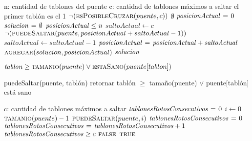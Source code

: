 \vspace*{0.5cm}


\begin{codebox}
\li \Comment n: cantidad de tablones del puente 
\li \Comment c: cantidad de tablones máximos a saltar 
\li \Comment el primer tablón es el 1
\li \If $\neg(\textnormal{\scshape esPosibleCruzar}(puente, c))$
\li     \Then 
            \Return $\emptyset$
        \End
\li $\id{posicionActual} \gets 0$
\li $\id{solucion} \gets \emptyset$
\li \While $\id{posicionActual} \leq \id{n}$
\li     \Do 
            $saltoActual \gets c$
\li         \While $\neg(\textnormal{\scshape puedeSaltar}(puente, posicionActual + saltoActual - 1))$
\li         \Do 
                $saltoActual \gets saltoActual - 1$
            \End
\li     $\id{posicionActual} \gets \id{posicionActual} + \id{saltoActual}$
\li     $\textnormal{\scshape agregar}(solucion, posicionActual)$    
        \End
\li \Return $\id{solucion}$
\end{codebox}      



\vspace*{0.5cm}



\begin{codebox}
    \Return $\id{tablon} \geq \proc{tamanio}(puente) \lor \proc{estaSano}(puente[tablon])$
\end{codebox}



puedeSaltar(puente, tablón)
  retornar tablón $\geq$ tamaño(puente) $\lor$ puente[tablón] está sano



\vspace*{0.5cm}



\begin{codebox}
\li \Comment c: cantidad de tablones máximos a saltar
\li $\id{tablonesRotosConsecutivos} \gets 0$
\li \For $i \gets 0$ \To $\textnormal{\scshape tamanio}(puente) - 1$
\li     \Do 
            \If $\textnormal{\scshape puedeSaltar}(puente, i)$
\li             \Then
                    $\id{tablonesRotosConsecutivos} \gets 0$
\li         \Else
\li             $\id{tablonesRotosConsecutivos} \gets \id{tablonesRotosConsecutivos} + 1$
            \End
\li         \If $\id{tablonesRotosConsecutivos} \geq c$
\li             \Then
                    \Return $\textnormal{\scshape false}$
            \End
        \End
\li \Return $\textnormal{\scshape true}$   
\end{codebox}



